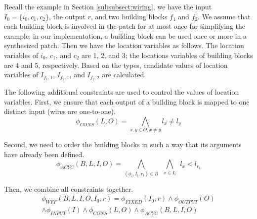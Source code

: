 Recall the example in Section \ref{subsubsect:wiring}, we have the input $I_0=\{i_0, c_1, c_2\}$, the output $r$, and two building blocks $f_1$ and $f_2$. We assume that each building block is involved in the patch for at most once for simplifying the example; in our implementation, a building block can be used once or more in a synthesized patch. Then we have the location variables as follows. The location variables of $i_0$, $c_1$, and $c_2$ are 1, 2, and 3; the locations variables of building blocks are 4 and 5, respectively. Based on the types, candidate values of location variables of $I_{f_1, 1}$, $I_{f_2, 1}$, and $I_{f_2, 2}$ are calculated. 

\begin{table}[H]
\centering
{}
\end{table}

The following additional constraints are used to control the values of location variables.
First, we ensure that each output of a building block is mapped to one distinct input (wires are one-to-one).
$$\phi_{CONS}(L,O) = \bigwedge_{x,y \in O, x \neq y} l_x \neq l_y$$

Second, we need to order the building blocks in such a way that its arguments have already been defined.
$$\phi_{ACYC}(B,L,I,O) = \bigwedge_{(\phi_{i},I_i,r_i) \in B} \ \  \bigwedge_{x \in I_i} \ \  l_x < l_{r_i}$$
 
Then, we combine all constraints together. 
\begin{align*}
\phi_{WFF}(B,L,I,O, I_0,r) = \phi_{FIXED}(I_0,r)  \land \phi_{OUTPUT}(O) \\ \land \phi_{INPUT}(I) \land \phi_{CONS}(L,O) \land \phi_{ACYC}(B,L,I,O)
\end{align*}

